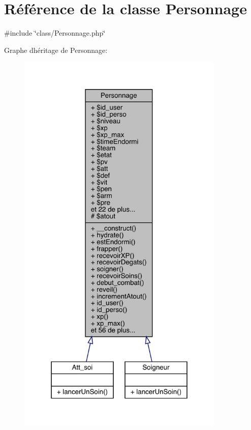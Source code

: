 \hypertarget{class_personnage}{}\section{Référence de la classe Personnage}
\label{class_personnage}


{\ttfamily \#include \char`\"{}class/\+Personnage.\+php\char`\"{}}



Graphe d\textquotesingle{}héritage de Personnage\+:\nopagebreak
\begin{figure}[H]
\begin{center}
\leavevmode
\includegraphics[width=280pt]{class_personnage__inherit__graph}
\end{center}
\end{figure}


